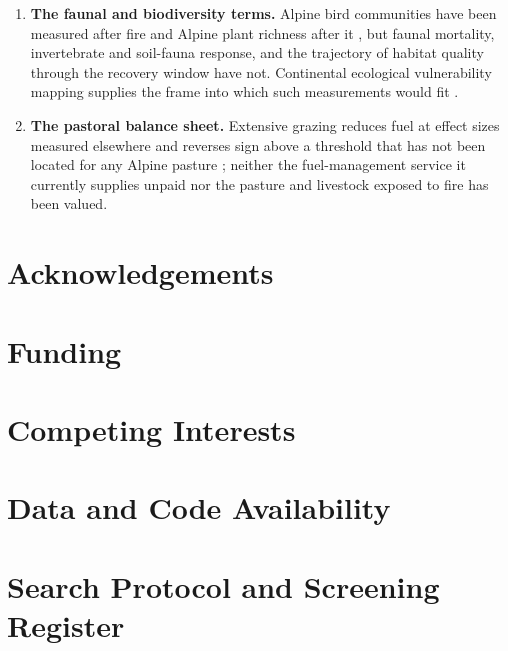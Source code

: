 \documentclass[11pt,a4paper]{article}
\begin{document}
\begin{enumerate}
    \item \textbf{The faunal and biodiversity terms.} Alpine bird communities have been measured after fire and Alpine plant richness after it \citep{rey_effects_2019, degiuli_arrested_2024}, but faunal mortality, invertebrate and soil-fauna response, and the trajectory of habitat quality through the recovery window have not. Continental ecological vulnerability mapping supplies the frame into which such measurements would fit \citep{arrogantefunes_mapping_2024}.
    \item \textbf{The pastoral balance sheet.} Extensive grazing reduces fuel at effect sizes measured elsewhere and reverses sign above a threshold that has not been located for any Alpine pasture \citep{xu_how_2026}; neither the fuel-management service it currently supplies unpaid nor the pasture and livestock exposed to fire has been valued.
\end{enumerate}


\section*{Acknowledgements}

\section*{Funding}

\section*{Competing Interests}

\section*{Data and Code Availability}


\appendix

\section{Search Protocol and Screening Register}
\label{app:protocol}
\end{document}
